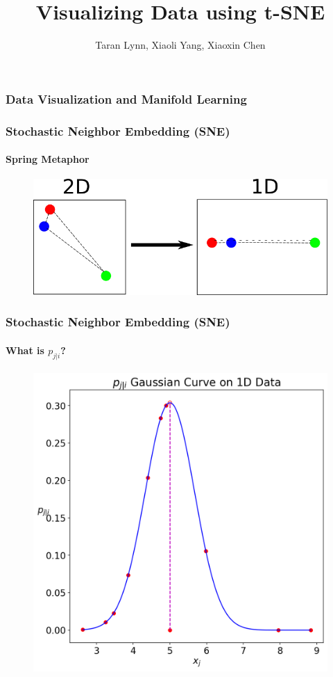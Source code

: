 \documentclass{beamer}
\title{Visualizing Data using t-SNE}
\author{Taran Lynn, Xiaoli Yang, Xiaoxin Chen}
\begin{document}
\maketitle

\begin{frame}
  \frametitle{Data Visualization and Manifold Learning}
\end{frame}

\begin{frame}
  \frametitle{Stochastic Neighbor Embedding (SNE)}
  \framesubtitle{Spring Metaphor}

  \begin{figure}
    \centering
    \includegraphics[width=\linewidth]{images/spring.png}
  \end{figure}
\end{frame}

\begin{frame}
  \frametitle{Stochastic Neighbor Embedding (SNE)}
  \framesubtitle{What is $p_{j|i}$?}

  \begin{figure}
    \centering
    \includegraphics[width=0.6\linewidth]{images/gauss/gauss.png}
  \end{figure}
\end{frame}
\end{document}
